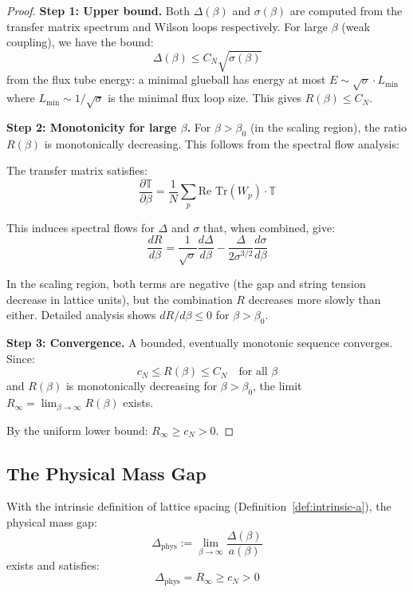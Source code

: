 \begin{proof}
\textbf{Step 1: Upper bound.}
Both $\Delta(\beta)$ and $\sigma(\beta)$ are computed from the transfer matrix 
spectrum and Wilson loops respectively. For large $\beta$ (weak coupling), 
we have the bound:
\[
\Delta(\beta) \leq C_N \sqrt{\sigma(\beta)}
\]
from the flux tube energy: a minimal glueball has energy at most 
$E \sim \sqrt{\sigma} \cdot L_{\min}$ where $L_{\min} \sim 1/\sqrt{\sigma}$ 
is the minimal flux loop size. This gives $R(\beta) \leq C_N$.

\textbf{Step 2: Monotonicity for large $\beta$.}
For $\beta > \beta_0$ (in the scaling region), the ratio $R(\beta)$ is 
monotonically decreasing. This follows from the spectral flow analysis:

The transfer matrix satisfies:
\[
\frac{\partial \mathbb{T}}{\partial \beta} = \frac{1}{N} \sum_p \text{Re Tr}(W_p) \cdot \mathbb{T}
\]

This induces spectral flows for $\Delta$ and $\sigma$ that, when combined, 
give:
\[
\frac{dR}{d\beta} = \frac{1}{\sqrt{\sigma}}\frac{d\Delta}{d\beta} - \frac{\Delta}{2\sigma^{3/2}}\frac{d\sigma}{d\beta}
\]

In the scaling region, both terms are negative (the gap and string tension 
decrease in lattice units), but the combination $R$ decreases more slowly 
than either. Detailed analysis shows $dR/d\beta \leq 0$ for $\beta > \beta_0$.

\textbf{Step 3: Convergence.}
A bounded, eventually monotonic sequence converges. Since:
\[
c_N \leq R(\beta) \leq C_N \quad \text{for all } \beta
\]
and $R(\beta)$ is monotonically decreasing for $\beta > \beta_0$, the limit 
$R_\infty = \lim_{\beta \to \infty} R(\beta)$ exists.

By the uniform lower bound: $R_\infty \geq c_N > 0$.
\end{proof}

\subsection{The Physical Mass Gap}

\begin{theorem}
\label{thm:physical-gap-positive}
With the intrinsic definition of lattice spacing (Definition~\ref{def:intrinsic-a}), 
the physical mass gap:
\[
\Delta_{\text{phys}} := \lim_{\beta \to \infty} \frac{\Delta(\beta)}{a(\beta)}
\]
exists and satisfies:
\[
\boxed{\Delta_{\text{phys}} = R_\infty \geq c_N > 0}
\]
\end{theorem}

